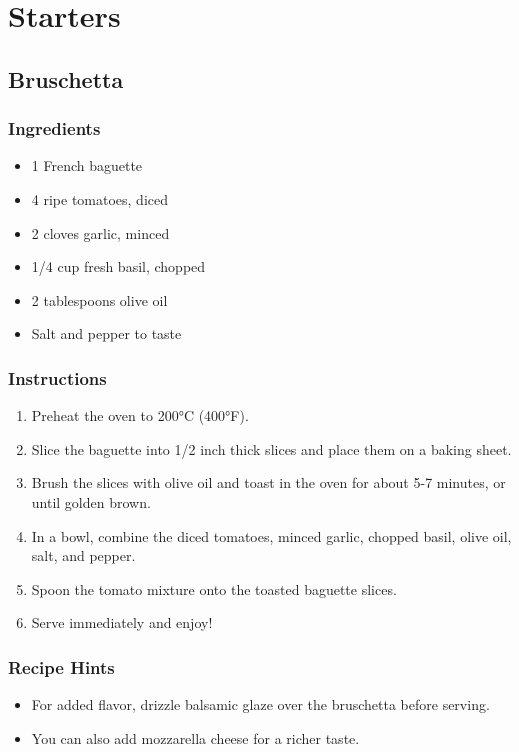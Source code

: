 \chapter{Starters}

\section{Bruschetta}
\subsection*{Ingredients}
\begin{itemize}
    \item 1 French baguette
    \item 4 ripe tomatoes, diced
    \item 2 cloves garlic, minced
    \item 1/4 cup fresh basil, chopped
    \item 2 tablespoons olive oil
    \item Salt and pepper to taste
\end{itemize}

\subsection*{Instructions}
\begin{enumerate}
    \item Preheat the oven to 200°C (400°F).
    \item Slice the baguette into 1/2 inch thick slices and place them on a baking sheet.
    \item Brush the slices with olive oil and toast in the oven for about 5-7 minutes, or until golden brown.
    \item In a bowl, combine the diced tomatoes, minced garlic, chopped basil, olive oil, salt, and pepper.
    \item Spoon the tomato mixture onto the toasted baguette slices.
    \item Serve immediately and enjoy!
\end{enumerate}

\subsection*{Recipe Hints}
\begin{itemize}
    \item For added flavor, drizzle balsamic glaze over the bruschetta before serving.
    \item You can also add mozzarella cheese for a richer taste.
\end{itemize}